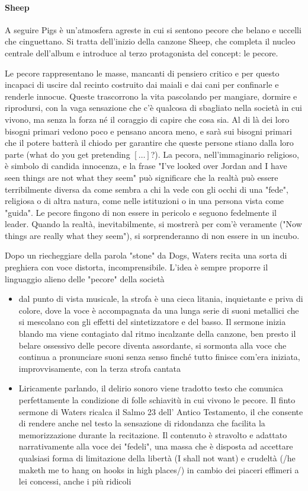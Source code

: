 \documentclass[class=book, crop=false, oneside, 12pt]{standalone}
\begin{document}
    \paragraph{Sheep}
    A seguire Pigs è un'atmosfera agreste in cui si sentono pecore che belano e uccelli che cinguettano. Si tratta dell'inizio della canzone Sheep, che completa il nucleo centrale dell'album e introduce al terzo protagonista del concept: le pecore.

    Le pecore rappresentano le masse, mancanti di pensiero critico e per questo incapaci di uscire dal recinto costruito dai maiali e dai cani per confinarle e renderle innocue. Queste trascorrono la vita pascolando per mangiare, dormire e riprodursi, con la vaga sensazione che c'è qualcosa di sbagliato nella società in cui vivono, ma senza la forza né il coraggio di capire che cosa sia. Al di là dei loro bisogni primari vedono poco e pensano ancora meno, e sarà sui bisogni primari che il potere batterà il chiodo per garantire che queste persone stiano dalla loro parte (what do you get pretending \([\ldots]\)?). La pecora, nell'immaginario religioso, è simbolo di candida innocenza, e la frase "I've looked over Jordan and I have seen things are not what they seem" può significare che la realtà può essere terribilmente diversa da come sembra a chi la vede con gli occhi di una "fede", religiosa o di altra natura, come nelle istituzioni o in una persona vista come "guida". Le pecore fingono di non essere in pericolo e seguono fedelmente il leader. Quando la realtà, inevitabilmente, si mostrerà per com'è veramente ("Now things are really what they seem"), si sorprenderanno di non essere in un incubo.

    Dopo un riecheggiare della parola "stone" da Dogs, Waters recita una sorta di preghiera con voce distorta, incomprensibile. L'idea è sempre proporre il linguaggio alieno delle "pecore" della società

    \begin{itemize}
    \item dal punto di vista musicale, la strofa è una cieca litania, inquietante e priva di colore, dove la voce è accompagnata da una lunga serie di suoni metallici che si mescolano con gli effetti del sintetizzatore e del basso. Il sermone inizia blando ma viene contagiato dal ritmo incalzante della canzone, ben presto il belare ossessivo delle pecore diventa assordante, si sormonta alla voce che continua a pronunciare suoni senza senso finché tutto finisce com'era iniziata, improvvisamente, con la terza strofa cantata
    \item Liricamente parlando, il delirio sonoro viene tradotto testo che comunica perfettamente la condizione di folle schiavitù in cui vivono le pecore. Il finto sermone di Waters ricalca il Salmo 23 dell' Antico Testamento, il che consente di rendere anche nel testo la sensazione di ridondanza che facilita la memorizzazione durante la recitazione. Il contenuto è stravolto e adattato narrativamente alla voce dei  "fedeli", una massa che è disposta ad accettare qualsiasi forma di limitazione della libertà (I shall not want) e crudeltà (/he maketh me to hang on hooks in high places/) in cambio dei piaceri effimeri a lei concessi, anche i più ridicoli
    \end{itemize}
\end{document}

